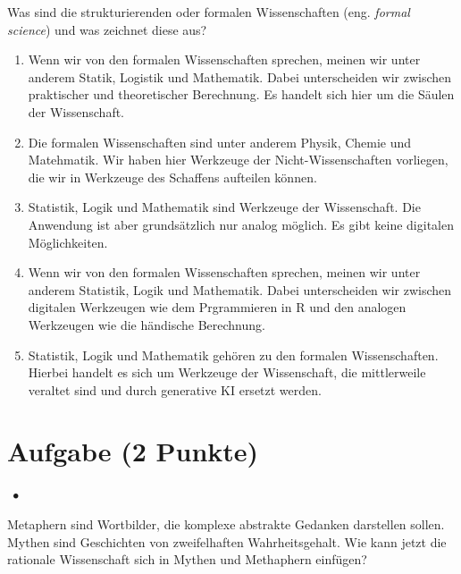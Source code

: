 \documentclass[a4paper, 9pt]{scrartcl}\usepackage[]{graphicx}\usepackage[]{xcolor}
\begin{document}
Was sind die strukturierenden oder formalen Wissenschaften (eng. \textit{formal science}) und was zeichnet diese aus?



\begin{enumerate}
\item [\textbf{A} \msquare] Wenn wir von den formalen Wissenschaften sprechen, meinen wir unter anderem Statik, Logistik und Mathematik. Dabei unterscheiden wir zwischen praktischer und theoretischer Berechnung. Es handelt sich hier um die Säulen der Wissenschaft.
\item [\textbf{B} \msquare] Die formalen Wissenschaften sind unter anderem Physik, Chemie und Matehmatik. Wir haben hier Werkzeuge der Nicht-Wissenschaften vorliegen, die wir in Werkzeuge des Schaffens aufteilen können.
\item [\textbf{C} \msquare] Statistik, Logik und Mathematik sind Werkzeuge der Wissenschaft. Die Anwendung ist aber grundsätzlich nur analog möglich. Es gibt keine digitalen Möglichkeiten.
\item [\textbf{D} \msquare] Wenn wir von den formalen Wissenschaften sprechen, meinen wir unter anderem Statistik, Logik und Mathematik. Dabei unterscheiden wir zwischen digitalen Werkzeugen wie dem Prgrammieren in R und den analogen Werkzeugen wie die händische Berechnung.
\item [\textbf{E} \msquare] Statistik, Logik und Mathematik gehören zu den formalen Wissenschaften. Hierbei handelt es sich um Werkzeuge der Wissenschaft, die mittlerweile veraltet sind und durch generative KI ersetzt werden.
\end{enumerate} 

\section{Aufgabe \hfill (2 Punkte)}

\ifcollection
\begin{flushright}
\tiny\vspace{-2Ex}
\textbf{\examinhaltstart}
\exammodulestatversuch $\;\bullet$
\exammodulebiostat
\vspace{-1Ex}
\end{flushright}
\fi




Metaphern sind Wortbilder, die komplexe abstrakte Gedanken darstellen sollen. Mythen sind Geschichten von zweifelhaften Wahrheitsgehalt. Wie kann jetzt die rationale Wissenschaft sich in Mythen und Methaphern einfügen?
\end{document}
